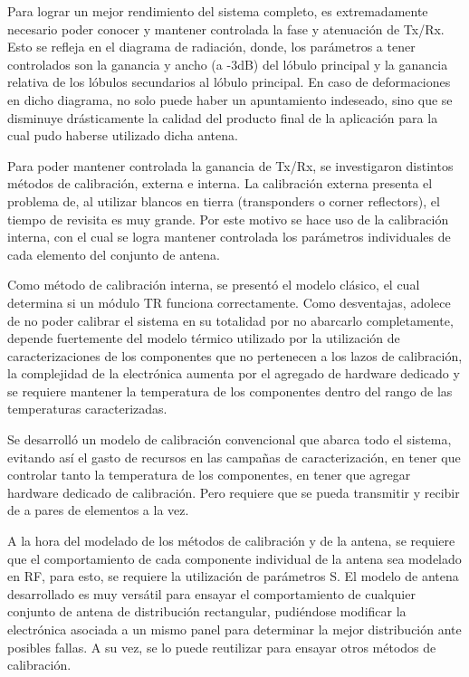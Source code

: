 Para lograr un mejor rendimiento del sistema completo, es extremadamente necesario poder conocer y mantener controlada la fase 
y atenuación de Tx/Rx. Esto se refleja en el diagrama de radiación, donde, los parámetros a tener controlados son la ganancia
y ancho (a -3dB) del lóbulo principal y la ganancia relativa de los lóbulos secundarios al lóbulo principal. En caso de 
deformaciones en dicho diagrama, no solo puede haber un apuntamiento indeseado, sino que se disminuye drásticamente la calidad 
del producto final de la aplicación para la cual pudo haberse utilizado dicha antena.

Para poder mantener controlada la ganancia de Tx/Rx, se investigaron distintos métodos de calibración, externa e interna. La 
calibración externa presenta el problema de, al utilizar blancos en tierra (transponders o corner reflectors), el tiempo de 
revisita es muy grande. Por este motivo se hace uso de la calibración interna, con el cual se logra mantener controlada 
los parámetros individuales de cada elemento del conjunto de antena. 

Como método de calibración interna, se presentó el modelo clásico, el cual determina si un módulo TR funciona correctamente. 
Como desventajas, adolece de no poder calibrar el sistema en su totalidad por no abarcarlo completamente, depende fuertemente del
modelo térmico utilizado por la utilización de caracterizaciones de los componentes que no pertenecen a los lazos de calibración, 
la complejidad de la electrónica aumenta por el agregado de hardware dedicado y se requiere mantener la temperatura de los 
componentes dentro del rango de las temperaturas caracterizadas.

Se desarrolló un modelo de calibración convencional que abarca todo el sistema, evitando así el gasto de recursos en las 
campañas de caracterización, en tener que controlar tanto la temperatura de los componentes, en tener que agregar hardware 
dedicado de calibración. Pero requiere que se pueda transmitir y recibir de a pares de elementos a la vez. 

A la hora del modelado de los métodos de calibración y de la antena, se requiere que el comportamiento de cada componente 
individual de la antena sea modelado en RF, para esto, se requiere la utilización de parámetros S. El modelo de antena 
desarrollado es muy versátil para ensayar el comportamiento de cualquier conjunto de antena de distribución rectangular, 
pudiéndose modificar la electrónica asociada a un mismo panel para determinar la mejor distribución ante posibles fallas.
A su vez, se lo puede reutilizar para ensayar otros métodos de calibración.

